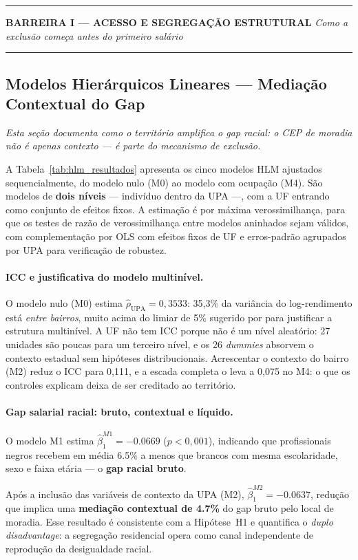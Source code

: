 \documentclass[12pt, a4paper, oneside]{article}
\begin{document}
\noindent\rule{\textwidth}{1pt}
\textbf{\large BARREIRA I --- ACESSO E SEGREGAÇÃO ESTRUTURAL}
\textit{Como a exclusão começa antes do primeiro salário}
\noindent\rule{\textwidth}{1pt}

\subsection{Modelos Hierárquicos Lineares --- Mediação Contextual do Gap}
\label{subsec:hlm_resultados}

\textit{Esta seção documenta como o território amplifica o gap racial:
o CEP de moradia não é apenas contexto --- é parte do mecanismo de exclusão.}

A Tabela~\ref{tab:hlm_resultados} apresenta os cinco modelos HLM ajustados
sequencialmente, do modelo nulo (M0) ao modelo com ocupação (M4). São modelos de
\textbf{dois níveis} --- indivíduo dentro da UPA ---, com a UF entrando como
conjunto de efeitos fixos. A estimação é por máxima verossimilhança, para que os
testes de razão de verossimilhança entre modelos aninhados sejam válidos, com
complementação por OLS com efeitos fixos de UF e erros-padrão agrupados por UPA
para verificação de robustez.

\paragraph{ICC e justificativa do modelo multinível.}
O modelo nulo (M0) estima $\hat{\rho}_{\text{UPA}} = 0,3533$:
35,3\% da variância do log-rendimento está \textit{entre bairros},
muito acima do limiar de 5\% sugerido por  para
justificar a estrutura multinível. A UF não tem ICC porque não é um nível
aleatório: 27 unidades são poucas para um terceiro nível, e os 26 \textit{dummies}
absorvem o contexto estadual sem hipóteses distribucionais. Acrescentar o contexto
do bairro (M2) reduz o ICC para 0,111, e a escada completa o leva a
0,075 no M4: o que os controles explicam deixa de ser creditado ao
território.

\paragraph{Gap salarial racial: bruto, contextual e líquido.}
O modelo M1 estima $\hat{\beta}_1^{M1} = -0.0669$
($p<0{,}001$), indicando que profissionais negros recebem em média
6.5\% a menos que brancos com mesma escolaridade, sexo e faixa
etária --- o \textbf{gap racial bruto}.

Após a inclusão das variáveis de contexto da UPA (M2),
$\hat{\beta}_1^{M2} = -0.0637$, redução que implica uma
\textbf{mediação contextual de 4.7\%} do gap bruto pelo
local de moradia. Esse resultado é consistente com a Hipótese~H1 e quantifica
o \textit{duplo disadvantage}: a segregação residencial opera como canal
independente de reprodução da desigualdade racial.
\end{document}
